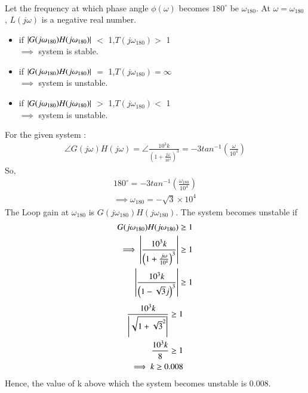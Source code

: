 \begin{enumerate}[label=\thesection.\arabic*.,ref=\thesection.\theenumi]
\begin{align}
\end{align}
Let the frequency at which phase angle $\phi(\omega)$ becomes $180^{\circ}$ be $\omega_{180}$. At $\omega = \omega_{180}$ , $L(j\omega)$ is a negative real number.
\begin{itemize}
    \item if $\left\vert{G(j\omega_{180})H(j\omega_{180})}\right\vert$ $<$ 1,$T(j\omega_{180}) >$ 1 \\ $\implies$ 
    system is stable.
    \item if $\left\vert{G(j\omega_{180})H(j\omega_{180})}\right\vert$ $=$ 1,$T(j\omega_{180}) = \infty $ \\ $\implies$
    system is unstable.
    \item if $\left\vert{G(j\omega_{180})H(j\omega_{180})}\right\vert$ $>$ 1,$T(j\omega_{180}) <$ 1 \\ $\implies$ 
    system is unstable.
\end{itemize}
For the given system :
\begin{align}
   \angle G(j\omega)H(j\omega) =  \angle\frac{10^3k}{\left(1+\frac{j\omega}{10^4}\right)^3} 
   = -3tan^{-1}\left({\frac{\omega}{10^4}}\right)
\end{align}
So,
\begin{align}
   180^{\circ}=  -3tan^{-1}\left({\frac{\omega_{180}}{10^4}}\right)\\
   \implies \omega_{180} = -\sqrt{3}\times 10^4
\end{align}
The Loop gain at $\omega_{180}$ is $G(j\omega_{180})H(j\omega_{180})$.
 The system becomes unstable if 
\begin{align}
G(j\omega_{180})H(j\omega_{180})\geq 1 \\
\implies \left\vert\frac{10^3k}{\left(1+\frac{j\omega}{10^4}\right)^3} \right\vert \geq 1\\
\left\vert\frac{10^3k}{\left(1-\sqrt{3}j\right)^3} \right\vert \geq 1
\end{align}
\begin{align}
     \frac{10^3k}{\left\vert\sqrt{1+{\sqrt{3}}^2}\right\vert} \geq 1\\
     \frac{10^3k}{8} \geq 1 \\
     \implies k \geq 0.008
\end{align}
Hence, the value of k above which the system becomes unstable is 0.008. 
\end{enumerate}
